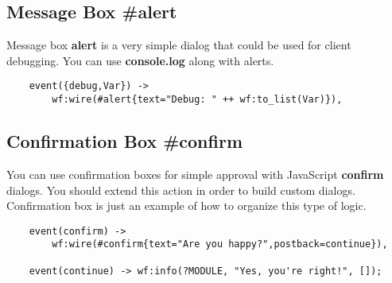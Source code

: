 \subsection{Message Box \#alert}
Message box {\bf alert} is a very simple dialog that could be used for client debugging.
You can use {\bf console.log} along with alerts.

\vspace{1\baselineskip}
\begin{lstlisting}
    event({debug,Var}) ->
        wf:wire(#alert{text="Debug: " ++ wf:to_list(Var)}),
\end{lstlisting}

\subsection{Confirmation Box \#confirm}
You can use confirmation boxes for simple approval with JavaScript {\bf confirm} dialogs.
You should extend this action in order to build custom dialogs. Confirmation box is just an example of how to
organize this type of logic.

\vspace{1\baselineskip}
\begin{lstlisting}
    event(confirm) ->
        wf:wire(#confirm{text="Are you happy?",postback=continue}),

    event(continue) -> wf:info(?MODULE, "Yes, you're right!", []);
\end{lstlisting}
\vspace{1\baselineskip}
